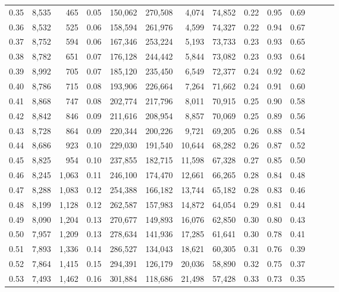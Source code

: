 \begin{tabular}{rrrrrrrrrrrrrr}
0.35 &  8,535 &    465 &  0.05 &  150,062 &  270,508 &   4,074 &  74,852 &  0.22 &  0.95 &      0.69 \\
0.36 &  8,532 &    525 &  0.06 &  158,594 &  261,976 &   4,599 &  74,327 &  0.22 &  0.94 &      0.67 \\
0.37 &  8,752 &    594 &  0.06 &  167,346 &  253,224 &   5,193 &  73,733 &  0.23 &  0.93 &      0.65 \\
0.38 &  8,782 &    651 &  0.07 &  176,128 &  244,442 &   5,844 &  73,082 &  0.23 &  0.93 &      0.64 \\
0.39 &  8,992 &    705 &  0.07 &  185,120 &  235,450 &   6,549 &  72,377 &  0.24 &  0.92 &      0.62 \\
0.40 &  8,786 &    715 &  0.08 &  193,906 &  226,664 &   7,264 &  71,662 &  0.24 &  0.91 &      0.60 \\
0.41 &  8,868 &    747 &  0.08 &  202,774 &  217,796 &   8,011 &  70,915 &  0.25 &  0.90 &      0.58 \\
0.42 &  8,842 &    846 &  0.09 &  211,616 &  208,954 &   8,857 &  70,069 &  0.25 &  0.89 &      0.56 \\
0.43 &  8,728 &    864 &  0.09 &  220,344 &  200,226 &   9,721 &  69,205 &  0.26 &  0.88 &      0.54 \\
0.44 &  8,686 &    923 &  0.10 &  229,030 &  191,540 &  10,644 &  68,282 &  0.26 &  0.87 &      0.52 \\
0.45 &  8,825 &    954 &  0.10 &  237,855 &  182,715 &  11,598 &  67,328 &  0.27 &  0.85 &      0.50 \\
0.46 &  8,245 &  1,063 &  0.11 &  246,100 &  174,470 &  12,661 &  66,265 &  0.28 &  0.84 &      0.48 \\
0.47 &  8,288 &  1,083 &  0.12 &  254,388 &  166,182 &  13,744 &  65,182 &  0.28 &  0.83 &      0.46 \\
0.48 &  8,199 &  1,128 &  0.12 &  262,587 &  157,983 &  14,872 &  64,054 &  0.29 &  0.81 &      0.44 \\
0.49 &  8,090 &  1,204 &  0.13 &  270,677 &  149,893 &  16,076 &  62,850 &  0.30 &  0.80 &      0.43 \\
0.50 &  7,957 &  1,209 &  0.13 &  278,634 &  141,936 &  17,285 &  61,641 &  0.30 &  0.78 &      0.41 \\
0.51 &  7,893 &  1,336 &  0.14 &  286,527 &  134,043 &  18,621 &  60,305 &  0.31 &  0.76 &      0.39 \\
0.52 &  7,864 &  1,415 &  0.15 &  294,391 &  126,179 &  20,036 &  58,890 &  0.32 &  0.75 &      0.37 \\
0.53 &  7,493 &  1,462 &  0.16 &  301,884 &  118,686 &  21,498 &  57,428 &  0.33 &  0.73 &      0.35 \\

\end{tabular}
